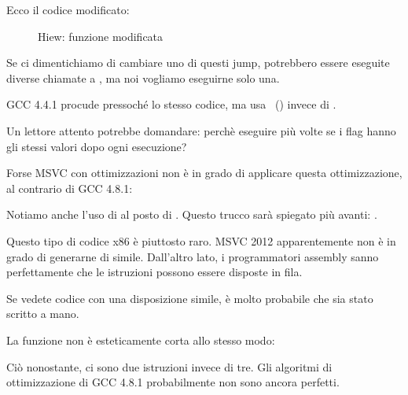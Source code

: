 \clearpage
Ecco il codice modificato:

\begin{figure}[H]
\centering
{}
\caption{Hiew: funzione  modificata}
\label{fig:jcc_hiew_2}
\end{figure}

Se ci dimentichiamo di cambiare uno di questi jump, potrebbero essere eseguite diverse chiamate a \printf, ma noi vogliamo eseguirne solo una.


\NonOptimizing GCC 4.4.1 
procude pressoché lo stesso codice, ma usa \puts~() invece di \printf.


Un lettore attento potrebbe domandare: perchè eseguire \CMP più volte se i flag hanno gli stessi valori dopo ogni esecuzione?

Forse MSVC con ottimizzazioni non è in grado di applicare questa ottimizzazione, al contrario di GCC 4.8.1:



Notiamo anche l'uso di  al posto di .
Questo trucco sarà spiegato più avanti: .

Questo tipo di codice x86 è piuttosto raro.
MSVC 2012 apparentemente non è in grado di generarne di simile.
Dall'altro lato, i programmatori assembly sanno perfettamente che le istruzioni  possono essere disposte in fila.

Se vedete codice con una disposizione simile, è molto probabile che sia stato scritto a mano.

La funzione  non è esteticamente corta allo stesso modo:



Ciò nonostante, ci sono due istruzioni  invece di tre.
Gli algoritmi di ottimizzazione di GCC 4.8.1 probabilmente non sono ancora perfetti. 
